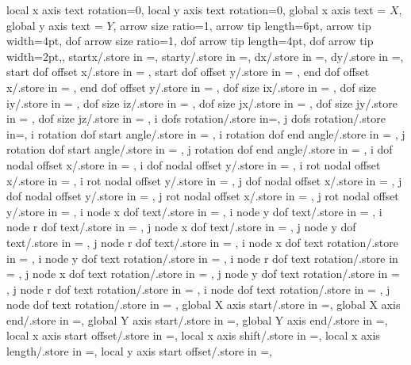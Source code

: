 {{local x axis text rotation=0,
local y axis text rotation=0,
global x axis text = $X$,
global y axis text = $Y$,
arrow size ratio=1,
arrow tip length=6pt,
arrow tip width=4pt,
dof arrow size ratio=1,
dof arrow tip length=4pt,
dof arrow tip width=2pt,},
startx/.store in =\startx,
starty/.store in =\starty,
dx/.store in =\deltaxdir,
dy/.store in =\deltaydir,
start dof offset x/.store in = \startoffsetx,
start dof offset y/.store in = \startoffsety,
end dof offset x/.store in = \endoffsetx,
end dof offset y/.store in = \endoffsety,
dof size ix/.store in = \lengthdofsix,
dof size iy/.store in = \lengthdofsiy,
dof size iz/.store in = \lengthdofsiz,
dof size jx/.store in = \lengthdofsjx,
dof size jy/.store in = \lengthdofsjy,
dof size jz/.store in = \lengthdofsjz,
i dofs rotation/.store in=\dofsroti,
j dofs rotation/.store in=\dofsrotj,
i rotation dof start angle/.store in = \irotdofstartangle,
i rotation dof end angle/.store in = \irotdofendangle,
j rotation dof start angle/.store in = \jrotdofstartangle,
j rotation dof end angle/.store in = \jrotdofendangle, 
i dof nodal offset x/.store in = \idofnodaloffsetx,
i dof nodal offset y/.store in = \idofnodaloffsety,
i rot nodal offset x/.store in = \irotnodaloffsetx,
i rot nodal offset y/.store in = \irotnodaloffsety,
j dof nodal offset x/.store in = \jdofnodaloffsetx,
j dof nodal offset y/.store in = \jdofnodaloffsety,
j rot nodal offset x/.store in = \jrotnodaloffsetx,
j rot nodal offset y/.store in = \jrotnodaloffsety,
i node x dof text/.store in = \inodexdoftext,
i node y dof text/.store in = \inodeydoftext,
i node r dof text/.store in = \inoderdoftext,
j node x dof text/.store in = \jnodexdoftext,
j node y dof text/.store in = \jnodeydoftext,
j node r dof text/.store in = \jnoderdoftext,
i node x dof text rotation/.store in = \inodexdoftextrot,
i node y dof text rotation/.store in = \inodeydoftextrot,
i node r dof text rotation/.store in = \inoderdoftextrot,
j node x dof text rotation/.store in = \jnodexdoftextrot,
j node y dof text rotation/.store in = \jnodeydoftextrot,
j node r dof text rotation/.store in = \jnoderdoftextrot,
i node dof text rotation/.store in = \inodedoftextrot,
j node dof text rotation/.store in = \jnodedoftextrot,
global X axis start/.store in =\globalXstart,
global X axis end/.store in =\globalXend,
global Y axis start/.store in =\globalYstart,
global Y axis end/.store in =\globalYend,
local x axis start offset/.store in =\localxstartoffset,
local x axis shift/.store in =\localxshift,
local x axis length/.store in =\localxlength,
local y axis start offset/.store in =\localystartoffset,
}
